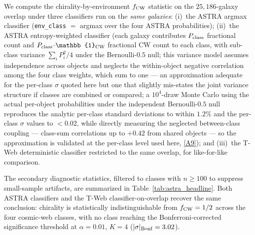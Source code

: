\documentclass[aps,prd,twocolumn,superscriptaddress,showpacs,preprintnumbers,nofootinbib,longbibliography,floatfix]{revtex4-2}
\newcommand{\repoBase}{https://github.com/Hubify-Projects/bigbounce/blob/main}
\begin{document}
We compute the chirality-by-environment $f_{\rm CW}$ statistic on the
$25{,}186$-galaxy overlap under three classifiers run on the
\emph{same galaxies}: (i)~the ASTRA argmax classifier
(\texttt{env\_class} $=$ argmax over the four ASTRA probabilities);
(ii)~the ASTRA entropy-weighted classifier (each galaxy contributes
$P_{\rm class}$ fractional count and $P_{\rm class}\!\cdot\!\mathbb{1}_{\rm CW}$
fractional CW count to each class, with sub-class variance
$\textstyle\sum_i P_i^2 / 4$ under the Bernoulli-$0.5$ null; this
variance model assumes independence across objects and neglects the
within-object negative correlation among the four class weights,
which sum to one --- an approximation adequate for the per-class
$\sigma$ quoted here but one that slightly mis-states the joint
variance structure if classes are combined or compared; a $10^4$-draw
Monte Carlo using the actual per-object probabilities under the
independent Bernoulli-$0.5$ null reproduces the analytic per-class
standard deviations to within $1.2\%$ and the per-class $\sigma$
values to $<\!0.02$, while directly measuring the neglected
between-class coupling --- class-sum correlations up to $+0.42$ from
shared objects --- so the approximation is validated at the per-class
level used here,
\href{\repoBase/pipelines/p5\_desi\_chirality/outputs/22\_r24conf\_local\_batch.json}{[A9]}); and
(iii)~the T-Web deterministic classifier restricted to the same
overlap, for like-for-like comparison.

The secondary diagnostic statistics, filtered to classes with $n \geq 100$ to
suppress small-sample artifacts, are summarized in
Table~\ref{tab:astra_headline}. Both ASTRA classifiers and the T-Web
classifier-on-overlap recover the same conclusion: chirality is
statistically indistinguishable from $f_{\rm CW} = 1/2$ across the
four cosmic-web classes, with no class reaching the
Bonferroni-corrected significance threshold at $\alpha = 0.01,\,K = 4$
($|\sigma|_{\rm Bonf} = 3.02$).
\end{document}
